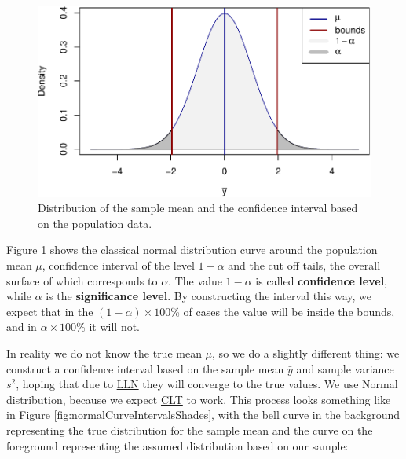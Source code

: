 \documentclass[
]{book}
\theoremstyle{definition}
\theoremstyle{definition}
\theoremstyle{definition}
\theoremstyle{definition}
\theoremstyle{remark}
\begin{document}
\begin{figure}
\centering
\includegraphics{Svetunkov---Statistics-for-Business-Analytics_files/figure-latex/normalCurveIntervals-1.pdf}
\caption{\label{fig:normalCurveIntervals}Distribution of the sample mean and the confidence interval based on the population data.}
\end{figure}

Figure \ref{fig:normalCurveIntervals} shows the classical normal distribution curve around the population mean \(\mu\), confidence interval of the level \(1-\alpha\) and the cut off tails, the overall surface of which corresponds to \(\alpha\). The value \(1-\alpha\) is called \textbf{confidence level}, while \(\alpha\) is the \textbf{significance level}. By constructing the interval this way, we expect that in the \((1-\alpha)\times 100\)\% of cases the value will be inside the bounds, and in \(\alpha\times 100\)\% it will not.

In reality we do not know the true mean \(\mu\), so we do a slightly different thing: we construct a confidence interval based on the sample mean \(\bar{y}\) and sample variance \(s^2\), hoping that due to \hyperref[LLNandCLT]{LLN} they will converge to the true values. We use Normal distribution, because we expect \hyperref[LLNandCLT]{CLT} to work. This process looks something like in Figure \ref{fig:normalCurveIntervalsShades}, with the bell curve in the background representing the true distribution for the sample mean and the curve on the foreground representing the assumed distribution based on our sample:
\end{document}

